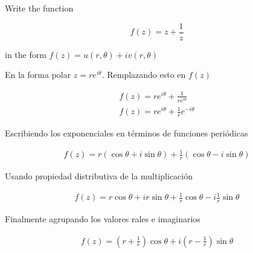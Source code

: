\begin{problem}{4}
    Write the function

    $$f(z) = z + \frac{1}{z}$$

    in the form $f(z) = u(r,\theta) + iv(r,\theta)$
\end{problem}


En la forma polar $z = re^{i\theta}$. Remplazando esto en $f(z)$

\begin{gather*}
    f(z) = re^{i\theta} + \frac{1}{re^{i\theta}}\\
    f(z) = re^{i\theta} + \frac{1}{r}e^{-i\theta}
\end{gather*}

Escribiendo los exponenciales en términos de funciones periódicas 

\begin{gather*}
    f(z) = r(\cos\theta + i\sin\theta) + \frac{1}{r}(\cos\theta - i\sin\theta)
\end{gather*}

Usando propiedad distributiva de la multiplicación 

\begin{gather*}
    f(z) = r\cos\theta + ir\sin\theta + \frac{1}{r}\cos\theta - i\frac{1}{r}\sin\theta
\end{gather*}

Finalmente agrupando los valores rales e imaginarios

\begin{mdframed}
    \vspace{-0.25cm}
    \begin{gather}
        f(z) = \left(r + \frac{1}{r}\right)\cos\theta + i\left(r   - \frac{1}{r}\right)\sin\theta
    \end{gather}
    \vspace{-0.3cm}
\end{mdframed}

